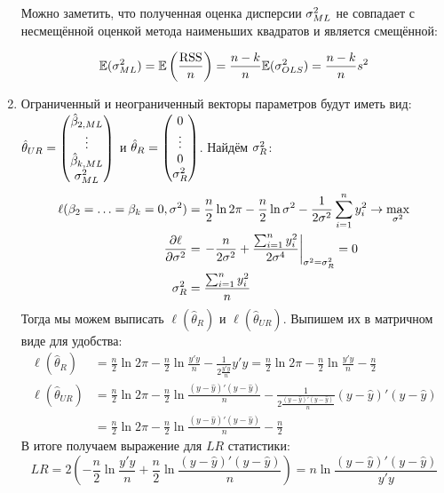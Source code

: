 \begin{problem}
\begin{sol}
\begin{enumerate}
Можно заметить, что полученная оценка дисперсии $\sigma^2_{ML}$ не совпадает с несмещённой оценкой метода наименьших квадратов и является смещённой:

\[\mathbb{E}(\sigma^2_{ML}) = \mathbb{E}\left( \frac{\text{RSS}}{n}\right) = \frac{n-k}{n}\mathbb{E}(\sigma^2_{OLS}) = \frac{n-k}{n}s^2\]

\item Ограниченный и неограниченный векторы параметров будут иметь вид:
$\hat{\theta}_{UR} = \begin{pmatrix} \hat{\beta}_{2, ML} \\ \vdots \\ \hat{\beta}_{k, ML} \\ \sigma^2_{ML} \end{pmatrix}$
и $\hat{\theta}_{R} = \begin{pmatrix} 0 \\ \vdots \\ 0 \\ \sigma^2_{R} \end{pmatrix}$.
Найдём $\sigma^2_{R}$:
\begin{align*}
\ell(\beta_2=\ldots=\beta_k=0, \sigma^2) &= \frac{n}{2} \ln 2 \pi - \frac{n}{2} \ln \sigma^2 - \frac{1}{2\sigma^2} \sum_{i=1}^n y_i^2 \rightarrow \max_{\sigma^2} \\
\frac{\partial \ell}{\partial \sigma^2} &= \left. -\frac{n}{2\sigma^2} + \frac{\sum_{i=1}^n y_i^2}{2\sigma^4} \right|_{\sigma^2= \sigma^2_{R}} = 0 \\
\sigma^2_{R} &= \frac{\sum_{i=1}^n y_i^2}{n}
\end{align*}
Тогда мы можем выписать $\ell(\hat{\theta}_{R})$ и $\ell(\hat{\theta}_{UR})$.
Выпишем их в матричном виде для удобства:
\begin{align*}
\ell(\hat{\theta}_{R}) &= \frac{n}{2} \ln 2 \pi - \frac{n}{2} \ln \frac{y'y}{n} - \frac{1}{2\frac{y'y}{n}} y'y = \frac{n}{2} \ln 2 \pi - \frac{n}{2} \ln \frac{y'y}{n} - \frac{n}{2} \\
\ell(\hat{\theta}_{UR}) &= \frac{n}{2} \ln 2 \pi - \frac{n}{2} \ln \frac{(y-\hat{y})'(y-\hat{y})}{n} - \frac{1}{2\frac{(y-\hat{y})'(y-\hat{y})}{n}} (y-\hat{y})'(y-\hat{y}) \\
&= \frac{n}{2} \ln 2 \pi - \frac{n}{2} \ln \frac{(y-\hat{y})'(y-\hat{y})}{n} - \frac{n}{2}
\end{align*}
В итоге получаем выражение для $LR$ статистики:
\[
LR = 2\left(- \frac{n}{2} \ln \frac{y'y}{n} + \frac{n}{2} \ln \frac{(y-\hat{y})'(y-\hat{y})}{n}\right) = n \ln \frac{(y-\hat{y})'(y-\hat{y})}{y'y}
\]
\end{enumerate}
\end{sol}
\end{problem}



